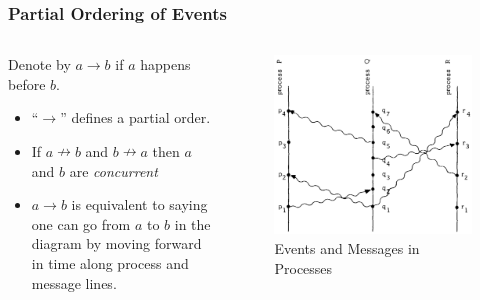 \documentclass{beamer}
\begin{document}
\frame
{
  \frametitle{Partial Ordering of Events}
	\begin{columns}
	\begin{column}{0.6\textwidth}

		Denote by $a\to b$ if $a$ happens before $b$.

		\begin{itemize}
			\item<2-> ``$\to$'' defines a partial order.
			\item<3-> If $a\nrightarrow b$ and $b\nrightarrow a$ then $a$ and $b$ are \emph{concurrent}
			\item<4-> $a\to b$ is equivalent to saying one can go from $a$ to $b$ in the diagram by moving forward in time along process and message lines.
		\end{itemize}


	\end{column}
	\begin{column}{0.4\textwidth}

		\begin{figure}[ht!]
		\includegraphics[width=\textwidth]{files/events-messages.png}
		\caption{Events and Messages in Processes}
		\end{figure}


	\end{column}
	\end{columns}

}
\end{document}
